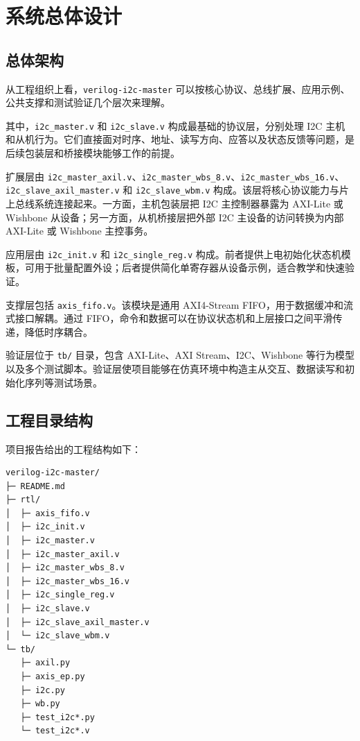 \documentclass[12pt,a4paper]{article}
\numberwithin{equation}{section}
\begin{document}
\clearpage
\section{系统总体设计}

\subsection{总体架构}

从工程组织上看，\texttt{verilog-i2c-master} 可以按核心协议、总线扩展、应用示例、公共支撑和测试验证几个层次来理解。

其中，\texttt{i2c\_master.v} 和 \texttt{i2c\_slave.v} 构成最基础的协议层，分别处理 I2C 主机和从机行为。它们直接面对时序、地址、读写方向、应答以及状态反馈等问题，是后续包装层和桥接模块能够工作的前提。

扩展层由 \texttt{i2c\_master\_axil.v}、\texttt{i2c\_master\_wbs\_8.v}、\texttt{i2c\_master\_wbs\_16.v}、\texttt{i2c\_slave\_axil\_master.v} 和 \texttt{i2c\_slave\_wbm.v} 构成。该层将核心协议能力与片上总线系统连接起来。一方面，主机包装层把 I2C 主控制器暴露为 AXI-Lite 或 Wishbone 从设备；另一方面，从机桥接层把外部 I2C 主设备的访问转换为内部 AXI-Lite 或 Wishbone 主控事务。

应用层由 \texttt{i2c\_init.v} 和 \texttt{i2c\_single\_reg.v} 构成。前者提供上电初始化状态机模板，可用于批量配置外设；后者提供简化单寄存器从设备示例，适合教学和快速验证。

支撑层包括 \texttt{axis\_fifo.v}。该模块是通用 AXI4-Stream FIFO，用于数据缓冲和流式接口解耦。通过 FIFO，命令和数据可以在协议状态机和上层接口之间平滑传递，降低时序耦合。

验证层位于 \texttt{tb/} 目录，包含 AXI-Lite、AXI Stream、I2C、Wishbone 等行为模型以及多个测试脚本。验证层使项目能够在仿真环境中构造主从交互、数据读写和初始化序列等测试场景。

\subsection{工程目录结构}

项目报告给出的工程结构如下：

\begin{lstlisting}
verilog-i2c-master/
├─ README.md
├─ rtl/
│  ├─ axis_fifo.v
│  ├─ i2c_init.v
│  ├─ i2c_master.v
│  ├─ i2c_master_axil.v
│  ├─ i2c_master_wbs_8.v
│  ├─ i2c_master_wbs_16.v
│  ├─ i2c_single_reg.v
│  ├─ i2c_slave.v
│  ├─ i2c_slave_axil_master.v
│  └─ i2c_slave_wbm.v
└─ tb/
   ├─ axil.py
   ├─ axis_ep.py
   ├─ i2c.py
   ├─ wb.py
   ├─ test_i2c*.py
   └─ test_i2c*.v
\end{lstlisting}
\end{document}
